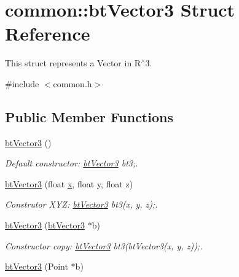 \hypertarget{structcommon_1_1btVector3}{\section{common\-:\-:bt\-Vector3 Struct Reference}
\label{structcommon_1_1btVector3}
}


This struct represents a Vector in R$^\wedge$3.  




{\ttfamily \#include $<$common.\-h$>$}

\subsection*{Public Member Functions}
\begin{DoxyCompactItemize}
\item 
\hypertarget{structcommon_1_1btVector3_a18054312f8905cc98697fe4b5918b92a}{\hyperlink{structcommon_1_1btVector3_a18054312f8905cc98697fe4b5918b92a}{bt\-Vector3} ()}\label{structcommon_1_1btVector3_a18054312f8905cc98697fe4b5918b92a}

\begin{DoxyCompactList}\small\item\em Default constructor\-: \hyperlink{structcommon_1_1btVector3}{bt\-Vector3} bt3;. \end{DoxyCompactList}\item 
\hypertarget{structcommon_1_1btVector3_a966ab1cbf7a9f4661ff9ab574466ad9f}{\hyperlink{structcommon_1_1btVector3_a966ab1cbf7a9f4661ff9ab574466ad9f}{bt\-Vector3} (float \hyperlink{structcommon_1_1btVector3_adbe23ed6ae54734cbdf7b37788e0c702}{x}, float y, float z)}\label{structcommon_1_1btVector3_a966ab1cbf7a9f4661ff9ab574466ad9f}

\begin{DoxyCompactList}\small\item\em Construtor X\-Y\-Z\-: \hyperlink{structcommon_1_1btVector3}{bt\-Vector3} bt3(x, y, z);. \end{DoxyCompactList}\item 
\hypertarget{structcommon_1_1btVector3_aaed6af5e7b2e6217483dffa991ecffd4}{\hyperlink{structcommon_1_1btVector3_aaed6af5e7b2e6217483dffa991ecffd4}{bt\-Vector3} (\hyperlink{structcommon_1_1btVector3}{bt\-Vector3} $\ast$b)}\label{structcommon_1_1btVector3_aaed6af5e7b2e6217483dffa991ecffd4}

\begin{DoxyCompactList}\small\item\em Constructor copy\-: \hyperlink{structcommon_1_1btVector3}{bt\-Vector3} bt3(bt\-Vector3(x, y, z));. \end{DoxyCompactList}\item 
\hypertarget{structcommon_1_1btVector3_a276502eb04ec63d64566fa32c67f96fe}{\hyperlink{structcommon_1_1btVector3_a276502eb04ec63d64566fa32c67f96fe}{bt\-Vector3} (Point $\ast$b)}\label{structcommon_1_1btVector3_a276502eb04ec63d64566fa32c67f96fe}


\end{DoxyCompactItemize}
